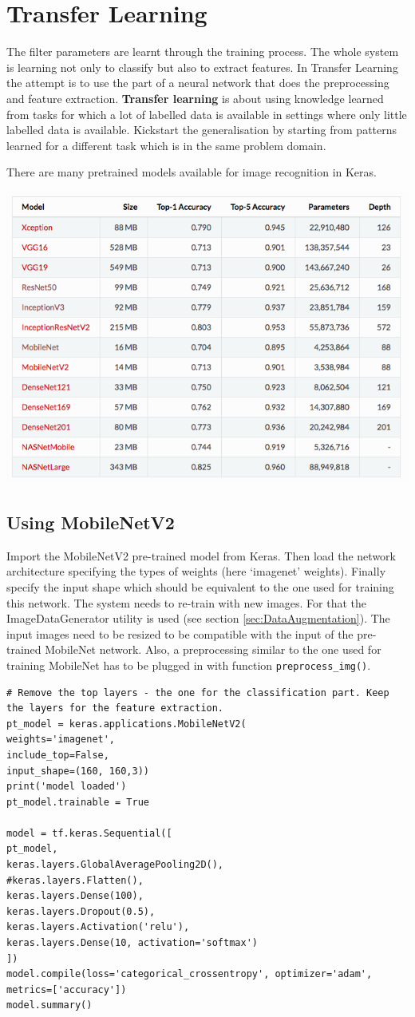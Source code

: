 \documentclass[11pt]{article}
\begin{document}
\section{Transfer Learning}

The filter parameters are learnt through the training process. The whole system is learning not only to classify but also to extract features. In Transfer Learning the attempt is to use the part of a neural network that does the preprocessing and feature extraction. \textbf{Transfer learning} is about using knowledge learned from tasks for which a lot of labelled data is available in settings where only little labelled data is available. Kickstart the generalisation by starting from patterns learned for a different task which is in the same problem domain.

There are many pretrained models available for image recognition in Keras.
\begin{center}
	\includegraphics[width=0.5\linewidth]{img/keras_pretrained_models}
\end{center}

\subsection{Using MobileNetV2}
Import the MobileNetV2 pre-trained model from Keras. Then load the network architecture specifying the types of weights (here ‘imagenet’ weights). Finally specify the input shape which should be equivalent to the one used for training this network. The system needs to re-train with new images.
For that the ImageDataGenerator utility is used (see section \ref{sec:DataAugmentation}). The
input images need to be resized to be compatible with the input of the pre- trained MobileNet network. Also, a preprocessing similar to the one used for training MobileNet has to be plugged in with function \texttt{preprocess_img()}.

\begin{verbatim}
# Remove the top layers - the one for the classification part. Keep the layers for the feature extraction.
pt_model = keras.applications.MobileNetV2(
weights='imagenet',
include_top=False,
input_shape=(160, 160,3))
print('model loaded')
pt_model.trainable = True

model = tf.keras.Sequential([
pt_model,
keras.layers.GlobalAveragePooling2D(),
#keras.layers.Flatten(),
keras.layers.Dense(100),
keras.layers.Dropout(0.5),
keras.layers.Activation('relu'),
keras.layers.Dense(10, activation='softmax')
])
model.compile(loss='categorical_crossentropy', optimizer='adam',
metrics=['accuracy'])
model.summary()
\end{verbatim}
\end{document}
